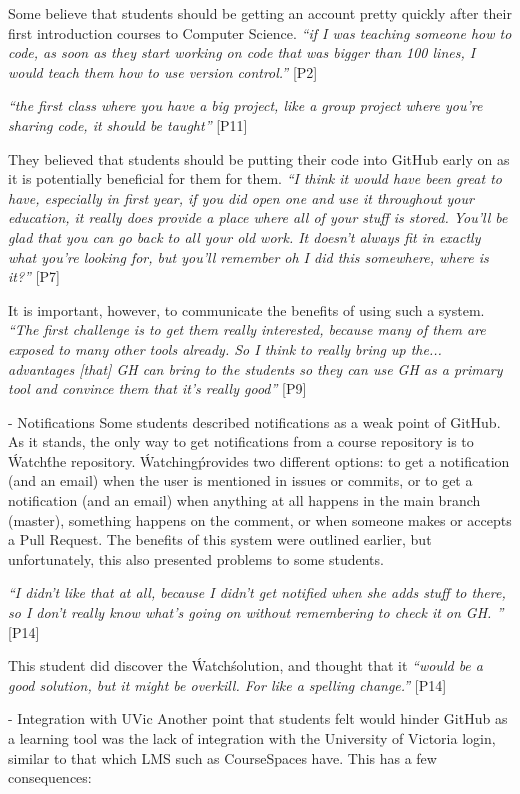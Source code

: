 Some believe that students should be getting an account pretty quickly after their first introduction courses to Computer Science. \textit{``if I was teaching someone how to code, as soon as they start working on code that was bigger than 100 lines, I would teach them how to use version control.''} [P2]

\textit{``the first class where you have a big project, like a group project where you're sharing code, it should be taught''} [P11]

They believed that students should be putting their code into GitHub early on as it is potentially beneficial for them for them. \textit{``I think it would have been great to have, especially in first year, if you did open one and use it throughout your education, it really does provide a place where all of your stuff is stored. You'll be glad that you can go back to all your old work. It doesn't always fit in exactly what you're looking for, but you'll remember oh I did this somewhere, where is it?''} [P7]

It is important, however, to communicate the benefits of using such a system. \textit{``The first challenge is to get them really interested, because many of them are exposed to many other tools already. So I think to really bring up the... advantages [that] GH can bring to the students so they can use GH as a primary tool and convince them that it's really good''} [P9]

- Notifications
Some students described notifications as a weak point of GitHub. As it stands, the only way to get notifications from a course repository is to \'Watch\' the repository. \'Watching\' provides two different options: to get a notification (and an email) when the user is mentioned in issues or commits, or to get a notification (and an email) when anything at all happens in the main branch (master), something happens on the comment, or when someone makes or accepts a Pull Request. The benefits of this system were outlined earlier, but unfortunately, this also presented problems to some students.

\textit{``I didn't like that at all, because I didn't get notified when she adds stuff to there, so I don't really know what's going on without remembering to check it on GH. ''} [P14]

This student did discover the \'Watch\' solution, and thought that it \textit{``would be a good solution, but it might be overkill. For like a spelling change.''} [P14]

- Integration with UVic
Another point that students felt would hinder GitHub as a learning tool was the lack of integration with the University of Victoria login, similar to that which LMS such as CourseSpaces have. This has a few consequences: %

